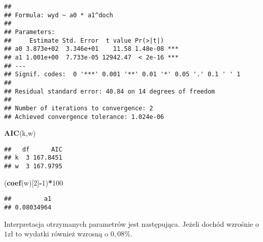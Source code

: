 \documentclass[polish,]{book}
\newenvironment{Shaded}{\begin{snugshade}}{\end{snugshade}}
\newcommand{\DecValTok}[1]{\textcolor[rgb]{0.00,0.00,0.81}{#1}}
\newcommand{\KeywordTok}[1]{\textcolor[rgb]{0.13,0.29,0.53}{\textbf{#1}}}
\newcommand{\NormalTok}[1]{#1}
\newcommand{\OperatorTok}[1]{\textcolor[rgb]{0.81,0.36,0.00}{\textbf{#1}}}
\begin{document}
\begin{verbatim}
## 
## Formula: wyd ~ a0 * a1^doch
## 
## Parameters:
##     Estimate Std. Error  t value Pr(>|t|)    
## a0 3.873e+02  3.346e+01    11.58 1.48e-08 ***
## a1 1.001e+00  7.733e-05 12942.47  < 2e-16 ***
## ---
## Signif. codes:  0 '***' 0.001 '**' 0.01 '*' 0.05 '.' 0.1 ' ' 1
## 
## Residual standard error: 40.84 on 14 degrees of freedom
## 
## Number of iterations to convergence: 2 
## Achieved convergence tolerance: 1.024e-06
\end{verbatim}

\begin{Shaded}
\begin{Highlighting}[]
\KeywordTok{AIC}\NormalTok{(k,w)}
\end{Highlighting}
\end{Shaded}

\begin{verbatim}
##   df      AIC
## k  3 167.8451
## w  3 167.9795
\end{verbatim}

\begin{Shaded}
\begin{Highlighting}[]
\NormalTok{(}\KeywordTok{coef}\NormalTok{(w)[}\DecValTok{2}\NormalTok{]}\OperatorTok{-}\DecValTok{1}\NormalTok{)}\OperatorTok{*}\DecValTok{100}
\end{Highlighting}
\end{Shaded}

\begin{verbatim}
##         a1 
## 0.08034964
\end{verbatim}

Interpretacja otrzymanych parametrów jest następująca. Jeżeli dochód wzrośnie o
\(1\)zł to wydatki również wzrosną o \(0,08\%\).
\end{document}
